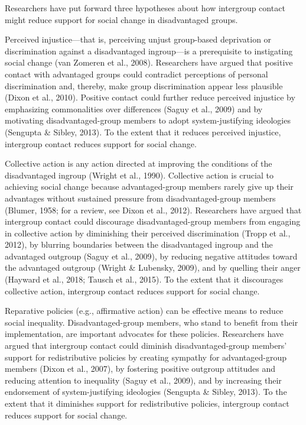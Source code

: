 \documentclass[12pt, letterpaper]{article}
\begin{document}
Researchers have put forward three hypotheses about how intergroup
contact might reduce support for social change in disadvantaged groups.

Perceived injustice---that is, perceiving unjust group-based deprivation
or discrimination against a disadvantaged ingroup---is a prerequisite to
instigating social change (van Zomeren et al., 2008). Researchers have
argued that positive contact with advantaged groups could contradict
perceptions of personal discrimination and, thereby, make group
discrimination appear less plausible (Dixon et al., 2010). Positive
contact could further reduce perceived injustice by emphasizing
commonalities over differences (Saguy et al., 2009) and by motivating
disadvantaged-group members to adopt system-justifying ideologies
(Sengupta \& Sibley, 2013). To the extent that it reduces perceived
injustice, intergroup contact reduces support for social change.

Collective action is any action directed at improving the conditions of
the disadvantaged ingroup (Wright et al., 1990). Collective action is
crucial to achieving social change because advantaged-group members
rarely give up their advantages without sustained pressure from
disadvantaged-group members (Blumer, 1958; for a review, see Dixon et
al., 2012). Researchers have argued that intergroup contact could
discourage disadvantaged-group members from engaging in collective
action by diminishing their perceived discrimination (Tropp et al.,
2012), by blurring boundaries between the disadvantaged ingroup and the
advantaged outgroup (Saguy et al., 2009), by reducing negative attitudes
toward the advantaged outgroup (Wright \& Lubensky, 2009), and by
quelling their anger (Hayward et al., 2018; Tausch et al., 2015). To the
extent that it discourages collective action, intergroup contact reduces
support for social change.

Reparative policies (e.g., affirmative action) can be effective means to
reduce social inequality. Disadvantaged-group members, who stand to
benefit from their implementation, are important advocates for these
policies. Researchers have argued that intergroup contact could diminish
disadvantaged-group members' support for redistributive policies by
creating sympathy for advantaged-group members (Dixon et al., 2007), by
fostering positive outgroup attitudes and reducing attention to
inequality (Saguy et al., 2009), and by increasing their endorsement of
system-justifying ideologies (Sengupta \& Sibley, 2013). To the extent
that it diminishes support for redistributive policies, intergroup
contact reduces support for social change.
\end{document}
